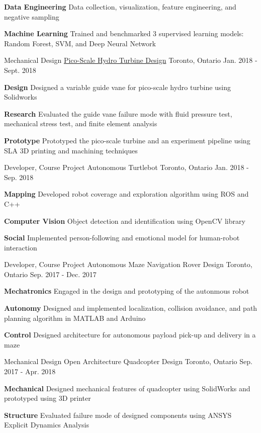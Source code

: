 \begin{cventries}
{\begin{cvitems}
			\item {\textbf{Data Engineering} Data collection, visualization, feature engineering, and negative sampling}
			\item {\textbf{Machine Learning} Trained and benchmarked 3 supervised learning models: Random Forest, SVM, and Deep Neural Network}
		\end{cvitems}
	}
	\cventry
	{Mechanical Design}
	{\href{https://werl.mie.utoronto.ca/pico-hydro-turbine-design/}{Pico-Scale Hydro Turbine Design}}
	{Toronto, Ontario}
	{Jan. 2018 - Sept. 2018}
	{
		\begin{cvitems}
			\item {\textbf{Design} Designed a variable guide vane for pico-scale hydro turbine using Solidworks}
			\item {\textbf{Research} Evaluated the guide vane failure mode with fluid pressure test, mechanical stress test, and finite element analysis}
			\item {\textbf{Prototype} Prototyped the pico-scale turbine and an experiment pipeline using SLA 3D printing and machining techniques}
		\end{cvitems}
	}
	\cventry
	{Developer, Course Project}
	{Autonomous Turtlebot}
	{Toronto, Ontario}
	{Jan. 2018 - Sep. 2018}
	{
		\begin{cvitems}
			\item {\textbf{Mapping} Developed robot coverage and exploration algorithm using ROS and C++}
			\item {\textbf{Computer Vision} Object detection and identification using OpenCV library}
			\item {\textbf{Social} Implemented person-following and emotional model for human-robot interaction}
		\end{cvitems}
	}
	\cventry
	{Developer, Course Project}
	{Autonomous Maze Navigation Rover Design}
	{Toronto, Ontario}
	{Sep. 2017 - Dec. 2017}
	{
		\begin{cvitems}
			\item { \textbf{Mechatronics} Engaged in the design and prototyping of the autonmous robot}
			\item { \textbf{Autonomy} Designed and implemented localization, collision avoidance, and path planning algorithm in MATLAB and Arduino}
			\item { \textbf{Control} Designed architecture for autonomous payload pick-up and delivery in a maze}
		\end{cvitems}
	}
	\cventry
	{Mechanical Design}
	{Open Architecture Quadcopter Design}
	{Toronto, Ontario}
	{Sep. 2017 - Apr. 2018}
	{
		\begin{cvitems}
			\item {\textbf{Mechanical} Designed mechanical features of quadcopter using SolidWorks and prototyped using 3D printer}
			\item {\textbf{Structure} Evaluated failure mode of designed components using ANSYS Explicit Dynamics Analysis}
		\end{cvitems}
	}
	
\end{cventries}

